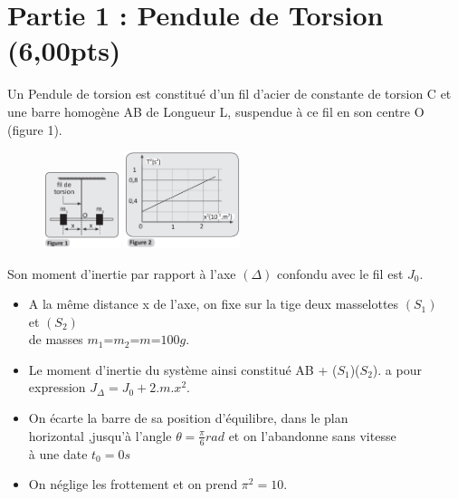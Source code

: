\documentclass[12pt]{article}
\begin{document}
\section*{Partie 1 : Pendule de Torsion \dotfill(6,00pts)}






Un Pendule de torsion est constitué d'un fil d'acier de constante de torsion C et une barre homogène AB de Longueur L, suspendue à ce fil en son centre O (figure 1).

\begin{figure}
\begin{center}
  \includegraphics[width=0.2\textwidth]{./img/ex02.png}
  \includegraphics[width=0.3\textwidth]{./img/ex021.png}
\end{center}
\end{figure}

Son moment d'inertie par rapport à l'axe $(\Delta)$ confondu avec le fil est $J_0$.
\begin{itemize}
	\item A la même distance x de l'axe, on fixe sur la tige deux masselottes $(S_1)$ \\et $(S_2)$ \\de masses $m_1$=$m_2$=$m$=$100g$.
	\item Le moment d'inertie du système ainsi constitué {AB + ($S_1$)($S_2$)}. a pour \\expression $J_{\Delta} = J_0 +2.m.x^2$.
	\item On écarte la barre de sa position d'équilibre, dans le plan \\horizontal ,jusqu'à l'angle  $\theta = \frac{\pi}{6}rad$ et on l'abandonne sans vitesse\\ à une date $t_0 = 0s$

	\item On néglige  les frottement et on prend $\pi^2 = 10$.
\end{itemize}
\end{document}

